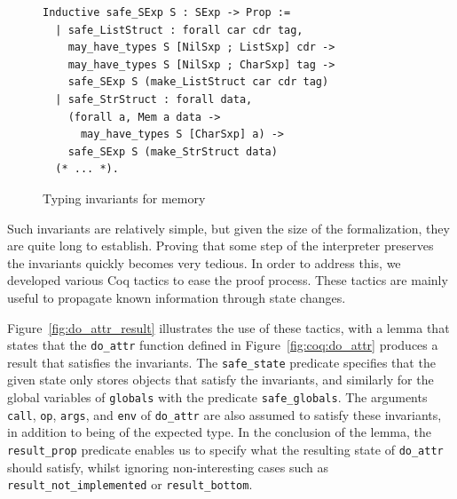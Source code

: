 \documentclass[
    sigplan,
    10pt,
    review, %
    natbib=false %
 ]{acmart}
\newcommand\et[1]{\todo[color=blue!20,size=\scriptsize]{#1}}
\begin{document}
\begin{figure}[t]
\begin{verbatim}
Inductive safe_SExp S : SExp -> Prop :=
  | safe_ListStruct : forall car cdr tag,
    may_have_types S [NilSxp ; ListSxp] cdr ->
    may_have_types S [NilSxp ; CharSxp] tag ->
    safe_SExp S (make_ListStruct car cdr tag)
  | safe_StrStruct : forall data,
    (forall a, Mem a data ->
      may_have_types S [CharSxp] a) ->
    safe_SExp S (make_StrStruct data)
  (* ... *).
\end{verbatim}
\vspace{-1em}
    \caption{Typing invariants for memory} %
    \label{fig:invariants:definition}
\end{figure}


Such invariants are relatively simple, but given the size of the formalization,
they are quite long to establish. Proving that some step of the interpreter preserves the invariants quickly becomes very tedious. In order to address this, we developed various Coq tactics to ease the proof process.
These tactics are mainly useful to propagate known information
through state changes.

Figure~\ref{fig:do_attr_result} illustrates the use of these tactics, with a lemma that states that the \texttt{do_attr} function
defined in Figure~\ref{fig:coq:do_attr} produces a result
that satisfies the invariants.
%
The \texttt{safe_state} predicate specifies
that the given state only stores objects that satisfy the invariants, and similarly
for the global variables of \texttt{globals} with the predicate \texttt{safe_globals}.
The arguments \texttt{call}, \texttt{op},
\texttt{args}, and \texttt{env} of \texttt{do_attr}
are also assumed to satisfy these invariants,
in addition to being of the expected type.
%
In the conclusion of the lemma, the \texttt{result_prop} predicate enables us
to specify what the resulting state of \texttt{do_attr} should satisfy,
whilst ignoring non-interesting cases
such as \texttt{result_not_implemented} or \texttt{result_bottom}.
\end{document}
